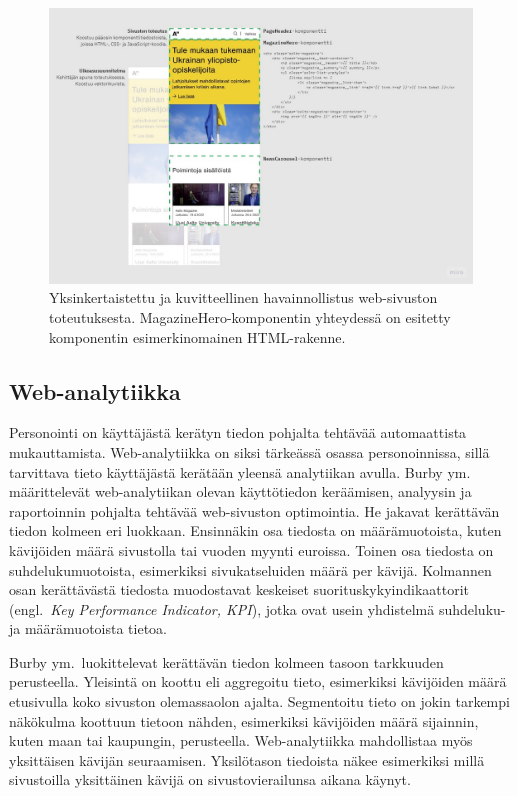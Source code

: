 \documentclass[finnish, 12pt, a4paper, elec, utf8, a-1b]{aaltothesis}
\begin{document}
\begin{figure}[h]
    \centering
    \includegraphics[width=\textwidth]{images/website-implementation.jpg}
    \caption{Yksinkertaistettu ja kuvitteellinen havainnollistus web-sivuston~\cite{aalto-website}
    toteutuksesta. MagazineHero-komponentin yhteydessä on esitetty komponentin
    esimerkinomainen HTML-rakenne.~\label{fig:website-implementation}}
\end{figure}

\subsection{Web-analytiikka}

Personointi on käyttäjästä kerätyn tiedon pohjalta tehtävää automaattista
mukauttamista. Web-analytiikka on siksi tärkeässä osassa personoinnissa, sillä
tarvittava tieto käyttäjästä kerätään yleensä analytiikan avulla. Burby
ym.~\cite{burby2007web} määrittelevät web-analytiikan olevan käyttötiedon
keräämisen, analyysin ja raportoinnin pohjalta tehtävää web-sivuston
optimointia. He jakavat kerättävän tiedon kolmeen eri luokkaan. Ensinnäkin osa
tiedosta on määrämuotoista, kuten kävijöiden määrä sivustolla tai vuoden myynti
euroissa. Toinen osa tiedosta on suhdelukumuotoista, esimerkiksi sivukatseluiden
määrä per kävijä. Kolmannen osan kerättävästä tiedosta muodostavat keskeiset
suorituskykyindikaattorit (engl.~\textit{Key Performance Indicator, KPI}), jotka
ovat usein yhdistelmä suhdeluku- ja määrämuotoista tietoa.

Burby ym.~luokittelevat kerättävän tiedon kolmeen tasoon tarkkuuden perusteella.
Yleisintä on koottu eli aggregoitu tieto, esimerkiksi kävijöiden määrä
etusivulla koko sivuston olemassaolon ajalta. Segmentoitu tieto on jokin
tarkempi näkökulma koottuun tietoon nähden, esimerkiksi kävijöiden määrä
sijainnin, kuten maan tai kaupungin, perusteella. Web-analytiikka mahdollistaa
myös yksittäisen kävijän seuraamisen. Yksilötason tiedoista näkee esimerkiksi
millä sivustoilla yksittäinen kävijä on sivustovierailunsa aikana käynyt.
\end{document}
